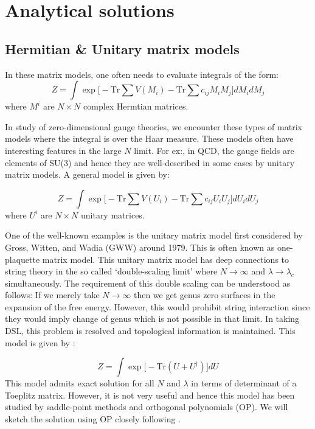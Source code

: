 \documentclass[11pt]{article}
\begin{document}
\section{Analytical solutions}

\subsection{Hermitian \& Unitary matrix models}

In these matrix models, one often needs to evaluate integrals of the form:
\begin{equation}
Z = \int \exp\Bigg[  -\mathrm{Tr} \sum V(M_{i})  -  \mathrm{Tr} \sum c_{ij}M_{i}M_{j}   \Bigg] dM_{i} dM_{j}
\end{equation}
where $M^{i}$ are $N \times N$ complex Hermtian matrices. 


In study of zero-dimensional gauge theories, we encounter these types of matrix models where the integral is over the Haar measure. These models often have interesting features in the large $N$ limit.
For ex:, in QCD, the gauge fields are elements of SU(3) and hence they are well-described in some cases by unitary matrix models. A general model is given by:



\begin{equation}
	Z = \int \exp\Bigg[  -\mbox{Tr} \sum V(U_{i})  -  \mbox{Tr} \sum c_{ij}U_{i}U_{j}   \Bigg] dU_{i} dU_{j}
\end{equation}
where $U^{i}$ are $N \times N$ unitary matrices. 

One of the well-known examples is the unitary matrix model first considered by Gross, Witten, and Wadia (GWW) around 1979. This is often known as one-plaquette matrix model. This unitary matrix model 
has deep connections to string theory in the so called `double-scaling limit' where $N \to \infty$ and $\lambda \to \lambda_{c}$ simultaneously. The requirement of this double scaling can be understood as follows: If we merely take $N \to \infty$ then we get genus zero surfaces in the expansion of the free energy. However, this would prohibit string interaction since they would imply change of genus which is not possible in that limit. In taking DSL, this problem is resolved and topological information is maintained. This model is given by : 


\begin{equation}
	Z = \int \exp \Big[- \mbox{Tr} (U + U^{\dagger})   \Big] dU
\end{equation}
This model admits exact solution for all $N$ and $\lambda$ in terms of determinant of a Toeplitz matrix. However, it is not very useful and hence this model has been studied by saddle-point methods and orthogonal polynomials (OP). We will sketch the solution using OP closely following \cite{Goldschmidt:1979hq}. 
\end{document}
